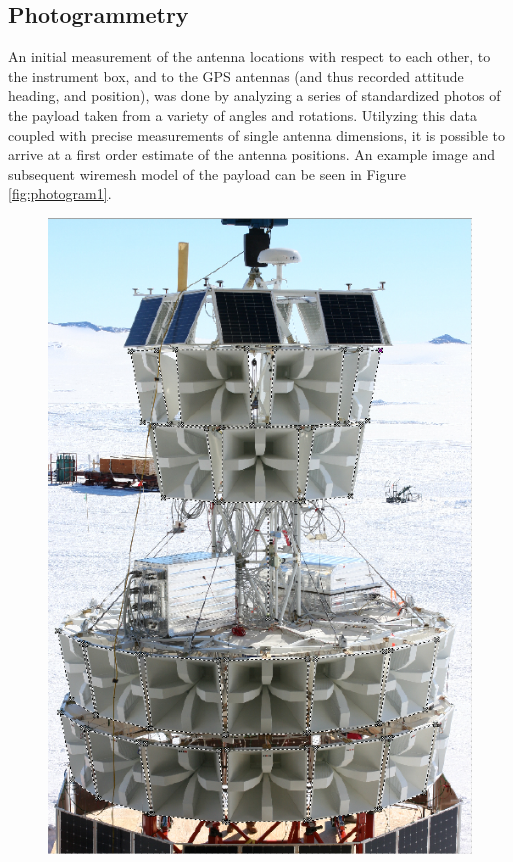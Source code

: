 	\subsection{Photogrammetry}
		An initial measurement of the antenna locations with respect to each other, to the instrument box, and to the GPS antennas (and thus recorded attitude heading, and position), was done by analyzing a series of standardized photos of the payload taken from a variety of angles and rotations.  Utilyzing this data coupled with precise measurements of single antenna dimensions, it is possible to arrive at a first order estimate of the antenna positions.  An example image and subsequent wiremesh model of the payload can be seen in Figure \ref{fig:photogram1}.
		
\begin{figure}
	\centering
	\includegraphics[height=0.5\textheight]{figures/KBelovANITA-III_photogrammetry_update-3}

\end{figure}
